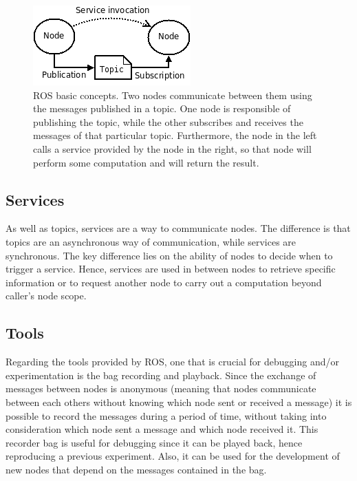 \begin{figure}
    \centering
    \includegraphics{Images/fig13-ros-basic-concept.png}
    \caption[ROS basic concept]{ROS basic concepts. Two nodes communicate between them using the messages published in a topic. One node is responsible of publishing the topic, while the other subscribes and receives the messages of that particular topic. Furthermore, the node in the left calls a service provided by the node in the right, so that node will perform some computation and will return the result. \cite{ros-website}}
    \label{fig:chapter1:ros:basic_concepts}
\end{figure}

\subsection{Services}
\label{subsec:chapter1:ros:services}
As well as topics, services are a way to communicate nodes. The difference is that topics are an asynchronous way of communication, while services are synchronous. The key difference lies on the ability of nodes to decide when to trigger a service. Hence, services are used in between nodes to retrieve specific information or to request another node to carry out a computation beyond caller's node scope.


\subsection{Tools}
\label{subsec:chapter1:ros:tools}
Regarding the tools provided by ROS, one that is crucial for debugging and/or experimentation is the bag recording and playback. Since the exchange of messages between nodes is anonymous (meaning that nodes communicate between each others without knowing which node sent or received a message) it is possible to record the messages during a period of time, without taking into consideration which node sent a message and which node received it. This recorder bag is useful for debugging since it can be played back, hence reproducing a previous experiment. Also, it can be used for the development of new nodes that depend on the messages contained in the bag.\\

